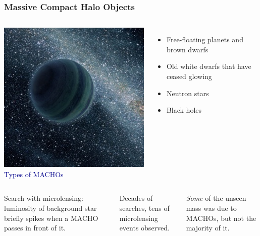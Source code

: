 \documentclass[compress]{beamer}
\begin{document}
\begin{frame}
\frametitle{Massive Compact Halo Objects}
\begin{columns}
\includegraphics[width=\linewidth]{pictures/free-floating-planets-microlensing_1.jpg}
\textcolor{darkblue}{Types of MACHOs}

\vspace{-0.2 cm}
\begin{itemize}\setlength{\itemsep}{-0.05 cm}
\item Free-floating planets and brown dwarfs
\item Old white dwarfs that have ceased glowing
\item Neutron stars
\item Black holes
\end{itemize}
\end{columns}

\vfill
\begin{columns}
Search with microlensing: luminosity of background star briefly spikes
when a MACHO passes in front of it.

\vspace{0.25 cm}
Decades of searches, tens of microlensing events observed.

\vspace{0.25 cm}
{\it Some} of the unseen mass was due to MACHOs, but not the majority
of it.


\end{columns}
\end{frame}
\end{document}
